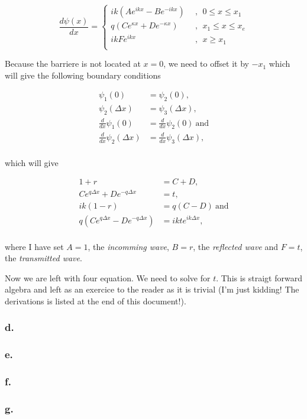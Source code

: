 \documentclass{article}
\begin{document}
\begin{equation}
\frac{d\psi(x)}{dx} = \begin{cases}
ik(Ae^{ikx} - Be^{-ikx}) \ \ &, \ \ 0 \leq x \leq x_1 \\
q(Ce^{\kappa x} + De^{-\kappa x}) \ \ &, \ \ x_1 \leq x \leq x_e \\
ikFe^{ikx}  &, \ \ x \geq x_1 \\
\end{cases}
\end{equation}

Because the barriere is not located at $x=0$, we need to offset it by $-x_1$ which will give the following boundary conditions

\begin{align}
\psi_1(0) &= \psi_2(0), \\
\psi_2(\Delta x) &= \psi_3(\Delta x),\\
\frac{d}{dx}\psi_1(0) &= \frac{d}{dx}\psi_2(0) \ \text{and} \\
\frac{d}{dx}\psi_2(\Delta x) &= \frac{d}{dx}\psi_3(\Delta x), \\
\end{align}

which will give

\begin{align}
1 + r &= C + D, \\
Ce^{q\Delta x} + De^{-q\Delta x} &= t,\\
ik(1-r) &= q(C - D) \ \text{and} \\
q(Ce^{q\Delta x} - De^{-q\Delta x}) &= ikte^{ik\Delta x}, \\
\end{align}

where I have set $A = 1$, the \textit{incomming wave}, $B = r$, the \textit{reflected wave} and  $F = t$, the \textit{transmitted wave}.

Now we are left with four equation. We need to solve for $t$. This is straigt forward algebra and left as an exercice to the reader as it is trivial (I'm just kidding! The derivations is listed at the end of this document!).

\subsubsection*{d.}

\subsubsection*{e.}

\subsubsection*{f.}

\subsubsection*{g.}
\end{document}
